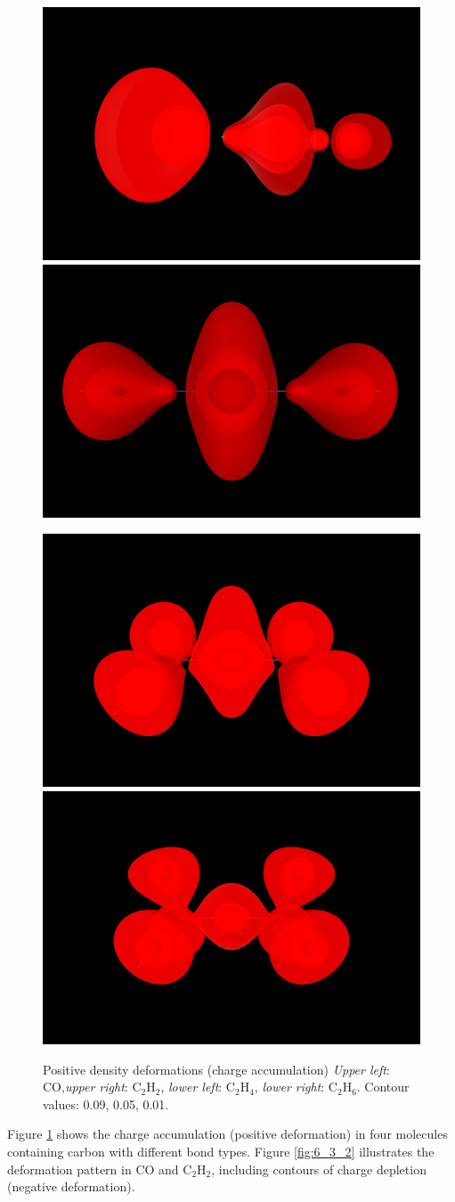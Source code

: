 \documentclass[10pt]{article}
\begin{document}
\vspace*{5mm}
\begin{figure}[H]
\begin{center}
\includegraphics[width=.3\linewidth]{CO-def.jpg}
\hspace*{5mm}
\includegraphics[width=.3\linewidth]{C2H2-def.png}

\includegraphics[width=.3\linewidth]{C2H4-def.png}
\hspace*{5mm}
\includegraphics[width=.3\linewidth]{C2H6-def.png}
\end{center}
\caption[Positive density deformations (charge accumulation)]{ Positive density deformations (charge accumulation) 
{\it Upper left}: CO,{\it upper right}: C$_2$H$_2$, 
{\it lower left}: C$_2$H$_4$, {\it lower right}: C$_2$H$_6$.
Contour values: 0.09, 0.05, 0.01.
\label{fig:6_3_1}}
\end{figure}

Figure \ref{fig:6_3_1} shows the charge accumulation (positive deformation) in
four molecules containing carbon with different bond types. Figure
\ref{fig:6_3_2}
illustrates the deformation pattern in CO and C$_2$H$_2$, including contours
of charge depletion (negative deformation).
\end{document}
